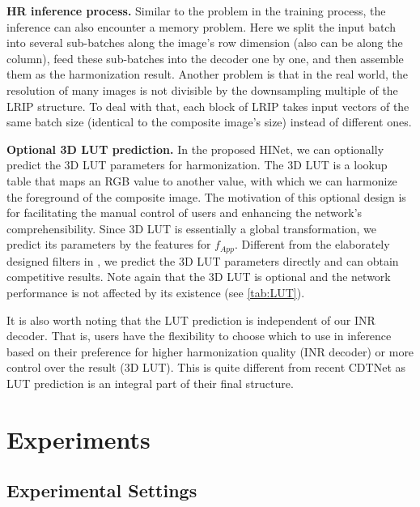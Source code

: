 \documentclass[10pt,journal,twocolumn,twoside]{IEEEtran}
\begin{document}
\textbf{HR inference process.} Similar to the problem in the training process, the inference can also encounter a memory problem. Here we split the input batch into several sub-batches along the image's row dimension (also can be along the column), feed these sub-batches into the decoder one by one, and then assemble them as the harmonization result. Another problem is that in the real world, the resolution of many images is not divisible by the downsampling multiple of the LRIP structure. To deal with that, each block of LRIP takes input vectors of the same batch size (identical to the composite image's size) instead of different ones.

\textbf{Optional 3D LUT prediction.} In the proposed HINet, we can optionally predict the 3D LUT parameters for harmonization. The 3D LUT is a lookup table that maps an RGB value to another value, with which we can harmonize the foreground of the composite image. The motivation of this optional design is for facilitating the manual control of users and enhancing the network's comprehensibility. Since 3D LUT is essentially a global transformation, we predict its parameters by the features for $f_{App}$. Different from the elaborately designed filters in \cite{xue2022dccf, ke2022harmonizer}, we predict the 3D LUT parameters directly and can obtain competitive results. Note again that the 3D LUT is optional and the network performance is not affected by its existence (see \cref{tab:LUT}).

It is also worth noting that the LUT prediction is independent of our INR decoder. That is, users have the flexibility to choose which to use in inference based on their preference for higher harmonization quality (INR decoder) or more control over the result (3D LUT). This is quite different from recent CDTNet \cite{cong2022high} as LUT prediction is an integral part of their final structure.



\section{Experiments}
\label{sec:exp}

\subsection{Experimental Settings}
\label{subsec:exp settings}
\end{document}
